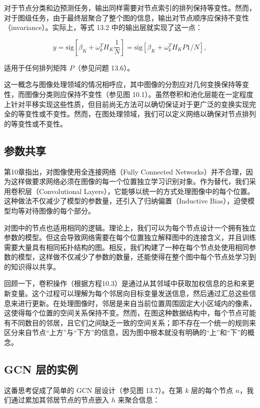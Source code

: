 对于节点分类和边预测任务，输出同样需要对节点索引的排列保持等变性。然而，对于图级任务，由于最终层聚合了整个图的信息，输出对节点顺序应保持不变性（invariance）。实际上，等式 13.2 中的输出层就实现了这一点：

\begin{equation}
y = \text{sig}[\beta_K + \omega_k^T H_K \frac{1}{N}] = \text{sig}[\beta_K + \omega_k^T H_KP1/N], 
\end{equation}

适用于任何排列矩阵 \(P\)（参见问题 13.6）。

这一概念与图像处理领域的情况相呼应，其中图像的分割应对几何变换保持等变性，而图像分类则应保持不变性（参见图 10.1）。虽然卷积和池化层能在一定程度上针对平移实现这些性质，但目前尚无方法可以确切保证对于更广泛的变换实现完全的等变性或不变性。然而，在图处理领域，我们可以定义网络以确保对节点排列的等变性或不变性。
\subsection{参数共享}
第10章指出，对图像使用全连接网络（Fully Connected Networks）并不合理，因为这样做要求网络必须在图像的每一个位置独立学习识别对象。作为替代，我们采用卷积层（Convolutional Layers），它能够以统一的方式处理图像中的每个位置。这种做法不仅减少了模型的参数量，还引入了归纳偏置（Inductive Bias），迫使模型均等对待图像的每个部分。

对图中的节点也适用相同的逻辑。理论上，我们可以为每个节点设计一个拥有独立参数的模型。但这会导致网络需要在每个位置独立解释图中的连接含义，并且训练需要大量具有相同拓扑结构的图。相反，我们构建了一种在每个节点处使用相同参数的模型，这样做不仅减少了参数的数量，还能使得在整个图中每个节点处学习到的知识得以共享。

回顾一下，卷积操作（根据方程10.3）是通过从其邻域中获取加权信息的总和来更新变量。这个过程可以理解为每个邻居向目标变量发送信息，然后通过汇总这些信息来进行更新。在处理图像时，邻居是来自当前位置周围固定大小区域内的像素，这使得每个位置的空间关系保持不变。然而，在图这种数据结构中，每个节点可能有不同数目的邻居，且它们之间缺乏一致的空间关系；即不存在一个统一的规则来区分来自节点“上方”与“下方”的信息，因为图中根本就没有明确的“上”和“下”的概念。

\subsection{GCN 层的实例}
这番思考促成了简单的 GCN 层设计（参见图 13.7）。在第 \(k\) 层的每个节点 \(n\)，我们通过累加其邻居节点的节点嵌入 \(h\) 来聚合信息：

